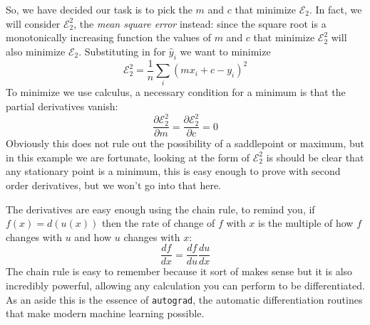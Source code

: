 \documentclass[12pt]{article}
\begin{document}
So, we have decided our task is to pick the $m$ and $c$ that minimize
$\mathcal{E}_2$. In fact, we will consider $\mathcal{E}_2^2$, the
\textsl{mean square error} instead: since the square root is a
monotonically increasing function the values of $m$ and $c$ that
minimize $\mathcal{E}_2^2$ will also minimize
$\mathcal{E}_2$. Substituting in for $\hat{y}_i$ we want to minimize
\begin{equation}
\mathcal{E}_2^2=\frac{1}{n}\sum_i(mx_i+c-y_i)^2
\end{equation}
To minimize we use calculus, a necessary condition for a minimum is that the partial derivatives vanish:
\begin{equation}
\frac{\partial \mathcal{E}_2^2}{\partial m}=\frac{\partial \mathcal{E}_2^2}{\partial c}=0
\end{equation}
Obviously this does not rule out the possibility of a saddlepoint or
maximum, but in this example we are fortunate, looking at the form of
$\mathcal{E}_2^2$ is should be clear that any stationary point is a
minimum, this is easy enough to prove with second order derivatives,
but we won't go into that here.

The derivatives are easy enough using the chain rule, to remind you,
if $f(x)=d(u(x))$ then the rate of change of $f$ with $x$ is the
multiple of how $f$ changes with $u$ and how $u$ changes with $x$:
\begin{equation}
\frac{df}{dx}=\frac{df}{du}\frac{du}{dx}
\end{equation}
The chain rule is easy to remember because it sort of makes sense but
it is also incredibly powerful, allowing any calculation you can
perform to be differentiated. As an aside this is the essence of
\texttt {autograd}, the automatic differentiation routines that make
modern machine learning possible. 
\end{document}
